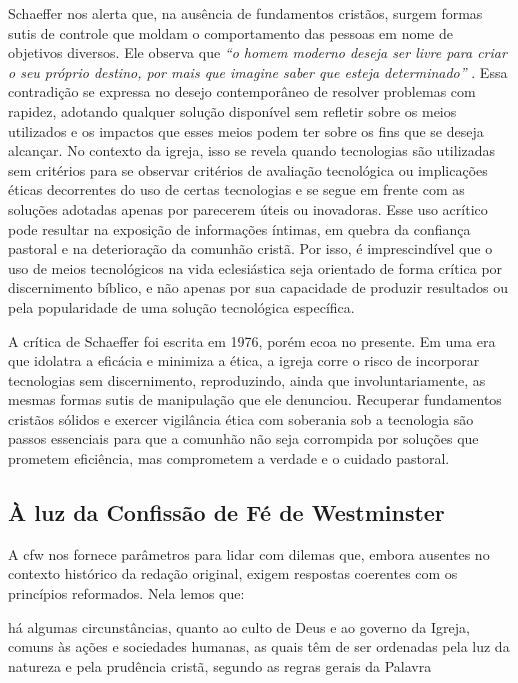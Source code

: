 Schaeffer nos alerta que, na ausência de fundamentos cristãos, surgem formas sutis de controle que moldam o comportamento das pessoas em nome de objetivos diversos. Ele observa que \textit{``o homem moderno deseja ser livre para criar o seu próprio destino, por mais que imagine saber que esteja determinado''} \cite[p.~169]{schaeffer2002}. Essa contradição se expressa no desejo contemporâneo de resolver problemas com rapidez, adotando qualquer solução disponível sem refletir sobre os meios utilizados e os impactos que esses meios podem ter sobre os fins que se deseja alcançar. No contexto da igreja, isso se revela quando tecnologias são utilizadas sem critérios para se observar critérios de avaliação tecnológica ou implicações éticas decorrentes do uso de certas tecnologias e se segue em frente com as soluções adotadas apenas por parecerem úteis ou inovadoras. Esse uso acrítico pode resultar na exposição de informações íntimas, em quebra da confiança pastoral e na deterioração da comunhão cristã. Por isso, é imprescindível que o uso de meios tecnológicos na vida eclesiástica seja orientado de forma crítica por discernimento bíblico, e não apenas por sua capacidade de produzir resultados ou pela popularidade de uma solução tecnológica específica.

A crítica de Schaeffer foi escrita em 1976, porém ecoa no presente. Em uma era que idolatra a eficácia e minimiza a ética, a igreja corre o risco de incorporar tecnologias sem discernimento, reproduzindo, ainda que involuntariamente, as mesmas formas sutis de manipulação que ele denunciou. Recuperar fundamentos cristãos sólidos e exercer vigilância ética com soberania sob a tecnologia são passos essenciais para que a comunhão não seja corrompida por soluções que prometem eficiência, mas comprometem a verdade e o cuidado pastoral.

\subsection{À luz da Confissão de Fé de Westminster}

A \gls{cfw} nos fornece parâmetros para lidar com dilemas que, embora ausentes no contexto histórico da redação original, exigem respostas coerentes com os princípios reformados. Nela lemos que:

\begin{citacao}
    há algumas circunstâncias, quanto ao culto de Deus e ao governo da Igreja, comuns às ações e sociedades humanas, as quais têm de ser ordenadas pela luz da natureza e pela prudência cristã, segundo as regras gerais da Palavra \cite[Cap.~I, §~VI]{cfw}    
\end{citacao}


